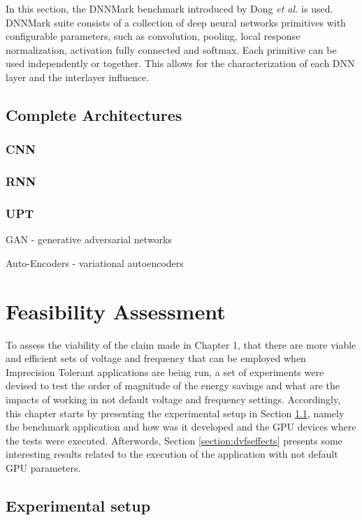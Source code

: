 In this section, the DNNMark benchmark introduced by Dong \textit{et al.} \cite{dong_dnnmark:_2017} is used. DNNMark suite consists of a collection of deep neural networks primitives with configurable parameters, such as convolution, pooling, local response normalization, activation fully connected and softmax. Each primitive can be used independently or together. This allows for the characterization of each DNN layer and the interlayer influence.



\subsection{Complete Architectures}
\subsubsection{CNN}
\subsubsection{RNN}
\subsubsection{UPT}
GAN - generative adversarial networks

Auto-Encoders - variational autoencoders

\section{Feasibility Assessment}
To assess the viability of the claim made in Chapter 1, that there are more viable and efficient sets of voltage and frequency that can be employed when Imprecision Tolerant applications are being run, a set of experiments were devised to test the order of magnitude of the energy savings and what are the impacts of working in not default voltage and frequency settings. Accordingly, this chapter starts by presenting the experimental setup in Section \ref{section:experimental_setup}, namely the benchmark application and how was it developed and the GPU devices where the tests were executed. Afterwords, Section \ref{section:dvfseffects} presents some interesting results related to the execution of the application with not default GPU parameters.


\subsection{Experimental setup}
\label{section:experimental_setup}

